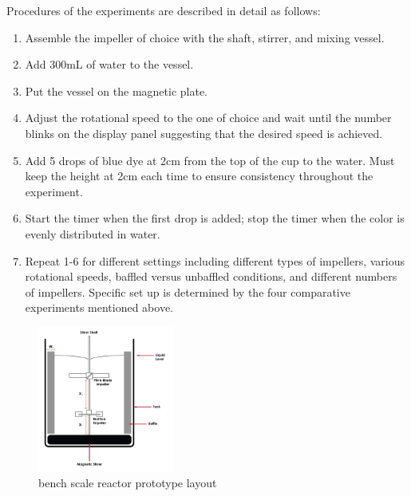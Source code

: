 Procedures of the experiments are described in detail as follows: 
\begin{enumerate}
	\item Assemble the impeller of choice with the shaft, stirrer, and mixing vessel. 
	\item Add 300mL of water to the vessel. 
	\item Put the vessel on the magnetic plate. 
	\item Adjust the rotational speed to the one of choice and wait until the number blinks on the display panel suggesting that the desired speed is achieved. 
	\item Add 5 drops of blue dye at 2cm from the top of the cup to the water. Must keep the height at 2cm each time to ensure consistency throughout the experiment.  
	\item Start the timer when the first drop is added; stop the timer when the color is evenly distributed in water. 
	\item Repeat 1-6 for different settings including different types of impellers, various rotational speeds, baffled versus unbaffled conditions, and different numbers of impellers. Specific set up is determined by the four comparative experiments mentioned above.  
\end{enumerate}

\begin{figure}[h]
	\centering
	\includegraphics[width=0.4\textwidth]{Stirrer.png}
	\caption{bench scale reactor prototype layout}
\end{figure}








